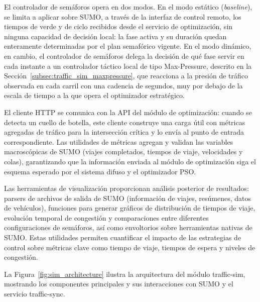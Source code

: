 El controlador de semáforos opera en dos modos. En el modo estático (\emph{baseline}), se limita a aplicar sobre SUMO, a través de la interfaz de control remoto, los tiempos de verde y de ciclo recibidos desde el servicio de optimización, sin ninguna capacidad de decisión local: la fase activa y su duración quedan enteramente determinadas por el plan semafórico vigente. En el modo dinámico, en cambio, el controlador de semáforos delega la decisión de qué fase servir en cada instante a un controlador táctico local de tipo Max-Pressure, descrito en la Sección~\ref{subsec:traffic_sim_maxpressure}, que reacciona a la presión de tráfico observada en cada carril con una cadencia de segundos, muy por debajo de la escala de tiempo a la que opera el optimizador estratégico.

El cliente HTTP se comunica con la API del módulo de optimización: cuando se detecta un cuello de botella, este cliente construye una carga útil con métricas agregadas de tráfico para la intersección crítica y lo envía al punto de entrada correspondiente. Las utilidades de métricas agregan y validan las variables macroscópicas de SUMO (viajes completados, tiempos de viaje, velocidades y colas), garantizando que la información enviada al módulo de optimización siga el esquema esperado por el sistema difuso y el optimizador PSO.

Las herramientas de visualización proporcionan análisis posterior de resultados: parsers de archivos de salida de SUMO (información de viajes, resúmenes, datos de vehículos), funciones para generar gráficos de distribución de tiempos de viaje, evolución temporal de congestión y comparaciones entre diferentes configuraciones de semáforos, así como envoltorios sobre herramientas nativas de SUMO. Estas utilidades permiten cuantificar el impacto de las estrategias de control sobre métricas clave como tiempo de viaje, tiempos de espera y niveles de congestión.

La Figura~\ref{fig:sim_architecture} ilustra la arquitectura del módulo traffic-sim, mostrando los componentes principales y sus interacciones con SUMO y el servicio traffic-sync.

